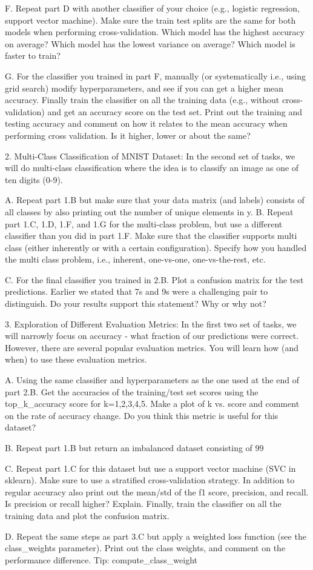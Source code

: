 F. Repeat part D with another classifier of your choice (e.g., logistic regression, support vector machine). Make sure the train test splits are the same for both models when performing cross-validation. Which model has the highest accuracy on average? Which model has the lowest variance on average? Which model is faster to train?

G. For the classifier you trained in part F, manually (or systematically i.e., using grid search) modify hyperparameters, and see if you can get a higher mean accuracy. Finally train the classifier on all the training data (e.g., without cross-validation) and get an accuracy score on the test set. Print out the training and testing accuracy and comment on how it relates to the mean accuracy when performing cross validation. Is it higher, lower or about the same?

2. Multi-Class Classification of MNIST Dataset: In the second set of tasks, we will do multi-class classification where the idea is to classify an image as one of ten digits (0-9).

A. Repeat part 1.B but make sure that your data matrix (and labels) consists of all classes by also printing out the number of unique elements in y. B. Repeat part 1.C, 1.D, 1.F, and 1.G for the multi-class problem, but use a different classifier than you did in part 1.F. Make sure that the classifier supports multi class (either inherently or with a certain configuration). Specify how you handled the multi class problem, i.e., inherent, one-vs-one, one-vs-the-rest, etc.

C. For the final classifier you trained in 2.B. Plot a confusion matrix for the test predictions. Earlier we stated that 7s and 9s were a challenging pair to distinguish. Do your results support this statement? Why or why not?

3. Exploration of Different Evaluation Metrics: In the first two set of tasks, we will narrowly focus on accuracy - what fraction of our predictions were correct. However, there are several popular evaluation metrics. You will learn how (and when) to use these evaluation metrics.

A. Using the same classifier and hyperparameters as the one used at the end of part 2.B. Get the accuracies of the training/test set scores using the top_k_accuracy score for k=1,2,3,4,5. Make a plot of k vs. score and comment on the rate of accuracy change. Do you think this metric is useful for this dataset?

B. Repeat part 1.B but return an imbalanced dataset consisting of 99%

C. Repeat part 1.C for this dataset but use a support vector machine (SVC in sklearn). Make sure to use a stratified cross-validation strategy. In addition to regular accuracy also print out the mean/std of the f1 score, precision, and recall. Is precision or recall higher? Explain. Finally, train the classifier on all the training data and plot the confusion matrix.

D. Repeat the same steps as part 3.C but apply a weighted loss function (see the class_weights parameter). Print out the class weights, and comment on the performance difference. Tip: compute_class_weight

